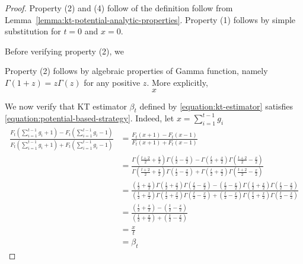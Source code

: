 \begin{proof}
Property (2) and (4) follow of the definition follow from
Lemma~\ref{lemma:kt-potential-analytic-properties}.
Property (1) follows by simple substitution for $t=0$ and $x=0$.

Before verifying property (2), we

Property (2) follows by algebraic properties of Gamma function, namely $\Gamma(1+z) = z \Gamma(z)$
for any positive $z$. More explicitly,
$$
x
$$

We now verify that KT estimator $\beta_t$ defined by \eqref{equation:kt-estimator}
satisfies \eqref{equation:potential-based-strategy}. Indeed, let $x=\sum_{i=1}^{t-1} g_i$
\begin{align*}
\frac{F_t(\sum_{i=1}^{t-1} g_i + 1) - F_t(\sum_{i=1}^{t-1} g_i - 1)}{F_t(\sum_{i=1}^{t-1} g_i + 1) + F_t(\sum_{i=1}^{t-1} g_i - 1)}
& = \frac{F_t(x + 1) - F_t(x - 1)}{F_t(x + 1) + F_t(x - 1)} \\
& = \frac{\Gamma(\frac{t+2}{2} + \frac{x}{2}) \Gamma(\frac{t}{2} - \frac{x}{2}) - \Gamma(\frac{t}{2} + \frac{x}{2}) \Gamma(\frac{t+2}{2} - \frac{x}{2})}{\Gamma(\frac{t+2}{2} + \frac{x}{2}) \Gamma(\frac{t}{2} - \frac{x}{2}) + \Gamma(\frac{t}{2} + \frac{x}{2}) \Gamma(\frac{t+2}{2} - \frac{x}{2})} \\
& = \frac{(\frac{t}{2} + \frac{x}{2})\Gamma(\frac{t}{2} + \frac{x}{2}) \Gamma(\frac{t}{2} - \frac{x}{2}) - (\frac{t}{2} - \frac{x}{2})\Gamma(\frac{t}{2} + \frac{x}{2}) \Gamma(\frac{t}{2} - \frac{x}{2})}{(\frac{t}{2} + \frac{x}{2})\Gamma(\frac{t}{2} + \frac{x}{2}) \Gamma(\frac{t}{2} - \frac{x}{2}) + (\frac{t}{2} - \frac{x}{2})\Gamma(\frac{t}{2} + \frac{x}{2}) \Gamma(\frac{t}{2} - \frac{x}{2})} \\
& = \frac{(\frac{t}{2} + \frac{x}{2}) - (\frac{t}{2} - \frac{x}{2})}{(\frac{t}{2} + \frac{x}{2}) + (\frac{t}{2} - \frac{x}{2})} \\
& = \frac{x}{t} \\
& = \beta_t
\end{align*}
\end{proof}
